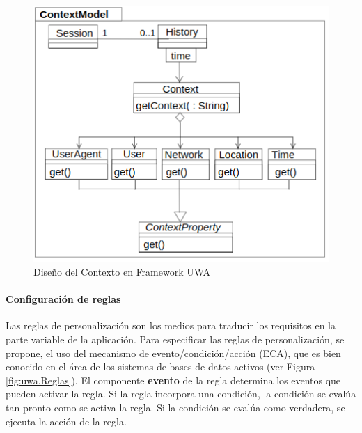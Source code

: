 \begin{figure}[h]
\begin{center}
 \includegraphics[width=5 in,totalheight=3 in]
{Ch1/Figuras/uwa.ContextModel.png}
\caption{Diseño del Contexto en Framework UWA}\label{uwa.ContextModel}
\end{center}
\end{figure}


\paragraph{Configuración de reglas}

Las reglas de personalización son los medios para traducir los requisitos en la parte variable de la aplicación. Para especificar las reglas de personalización, se propone, el uso del mecanismo de evento/condición/acción (ECA), que es bien conocido en el área de los sistemas de bases de datos activos (ver Figura \ref{fig:uwa.Reglas}). El componente \textbf{evento} de la regla determina los eventos que pueden activar la regla. Si la regla incorpora una condición, la condición se evalúa tan pronto como se activa la regla. Si la condición se evalúa como verdadera, se ejecuta la acción de la regla.



